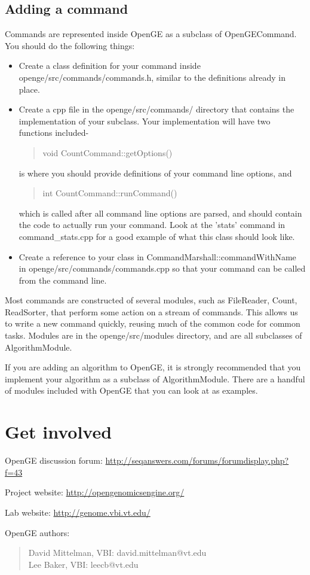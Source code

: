\documentclass[11pt]{article}
\newcommand {\cmd}[1] {\begin{quote}#1\end{quote}}
\begin{document}
\subsection {Adding a command}
Commands are represented inside OpenGE as a subclass of OpenGECommand. You should do the following things:
\begin{itemize}
\item Create a class definition for your command inside openge/src/commands/commands.h, similar to the definitions already in place.
\item Create a cpp file in the openge/src/commands/ directory that contains the implementation of your subclass. Your implementation will have two functions included- 
\cmd {void CountCommand::getOptions()}
is where you should provide definitions of your command line options, and 
\cmd{int CountCommand::runCommand()}
which is called after all command line options are parsed, and should contain the code to actually run your command. Look at the 'stats' command in command\_stats.cpp for a good example of what this class should look like.
\item Create a reference to your class in CommandMarshall::commandWithName in openge/src/commands/commands.cpp so that your command can be called from the command line.
\end{itemize}

Most commands are constructed of several modules, such as FileReader, Count, ReadSorter, that perform some action on a stream of commands. This allows us to write a new command quickly, reusing much of the common code for common tasks. Modules are in the openge/src/modules directory, and are all subclasses of AlgorithmModule.

If you are adding an algorithm to OpenGE, it is strongly recommended that you implement your algorithm as a subclass of AlgorithmModule. There are a handful of modules included with OpenGE that you can look at as examples.

\section {Get involved}

OpenGE discussion forum: \url{http://seqanswers.com/forums/forumdisplay.php?f=43}

Project website: \url{http://opengenomicsengine.org/}

Lab website: \url{http://genome.vbi.vt.edu/}

OpenGE authors:
\cmd{David Mittelman, VBI: david.mittelman@vt.edu\\Lee Baker, VBI: leecb@vt.edu}
\end{document}

